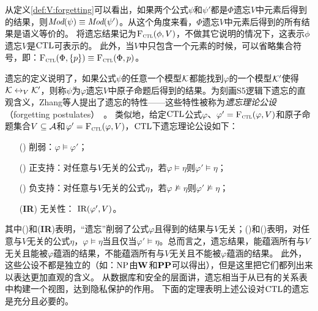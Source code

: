 从定义\ref{def:V:forgetting}可以看出，如果两个公式$\psi$和$\psi'$都是$\Phi$遗忘$V$中元素后得到的结果，则$\textit{Mod}(\psi)\equiv \textit{Mod}(\psi')$。从这个角度来看，$\Phi$遗忘$V$中元素后得到的所有结果是语义等价的。
将遗忘结果记为${\textsc{F}_{\textsc{ctl}}}(\phi,V)$，不做其它说明的情况下，这表示$\phi$遗忘$V$是$\textrm{CTL}$可表示的。
此外，当$V$中只包含一个元素的时候，可以省略集合符号，即：${\textsc{F}_{\textsc{ctl}}}(\Phi, \{p\}) \equiv {\textsc{F}_{\textsc{ctl}}}(\Phi, p)$。



遗忘的定义说明了，如果公式$\psi$的任意一个模型${\cal K}$都能找到$\varphi$的一个模型${\cal K}'$使得${\cal K} \leftrightarrow_V {\cal K}'$，则称$\psi$为$\varphi$遗忘$V$中原子命题后得到的结果。为刻画S5逻辑下遗忘的直观含义，Zhang等人提出了遗忘的特性——这些特性被称为\emph{遗忘理论公设}（forgetting postulates）~\cite{Yan:AIJ:2009}。
类似地，给定$\textrm{CTL}$公式$\varphi$、$\varphi'={\textsc{F}_{\textsc{ctl}}}(\varphi, V)$和原子命题集合$V\subseteq {\cal A}$和$\varphi'={\textsc{F}_{\textsc{ctl}}}(\varphi, V)$，$\textrm{CTL}$下遗忘理论公设如下：
\begin{itemize}
	\item[(\W)] 削弱：$\varphi \models \varphi'$；
	\item[(\PP)] 正支持：对任意与$V$无关的公式$\eta$，若$\varphi \models \eta$则$\varphi' \models \eta$；
	\item[(\NgP)] 负支持：对任意与$V$无关的公式$\eta$，若$\varphi \not \models \eta$则$\varphi' \not \models \eta$；
	\item[(\textbf{IR})] 无关性： $\textrm{IR}(\varphi', V)$。
\end{itemize}
其中(\W)和(\textbf{IR})表明，“遗忘”削弱了公式$\varphi$且得到的结果与$V$无关；(\PP)和(\NgP)表明，对任意与$V$无关的公式$\eta$，$\varphi \models \eta$当且仅当$\varphi' \models \eta$。总而言之，遗忘结果，能蕴涵所有与$V$无关且能被$\varphi$蕴涵的结果，不能蕴涵所有与$V$无关且不能被$\varphi$蕴涵的结果。
此外，这些公设不都是独立的（如：$\textmd{\rm NP}$由$\textbf{W}$和$\textbf{PP}$可以得出），但是这里把它们都列出来以表达更加直观的含义。
从数据库和安全的层面讲，遗忘相当于从已有的关系表中构建一个视图，达到隐私保护的作用。
下面的定理表明上述公设对$\textrm{CTL}$的遗忘是充分且必要的。

